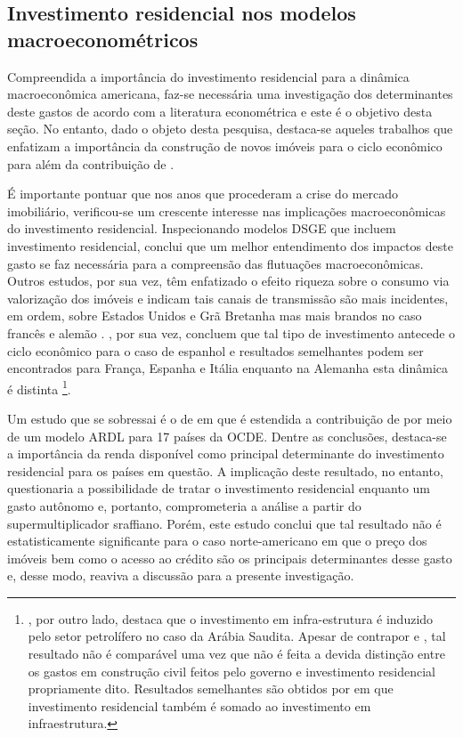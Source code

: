 \subsection{Investimento residencial nos modelos macroeconométricos}\label{RevEmpirica}

Compreendida a importância do investimento residencial para a dinâmica macroeconômica americana, faz-se necessária uma investigação dos determinantes deste gastos de acordo com a literatura econométrica e este é o objetivo desta seção. 
No entanto, dado o objeto desta pesquisa, destaca-se aqueles trabalhos que enfatizam a importância da construção de novos imóveis para o ciclo econômico para além da contribuição de \textcite{leamer_housing_2007}.


É importante pontuar que nos anos que procederam a crise do mercado imobiliário, verificou-se um crescente interesse nas implicações macroeconômicas do investimento residencial. Inspecionando modelos DSGE que incluem investimento residencial, \textcite{iacoviello_housing_2010} conclui que um melhor entendimento dos impactos deste gasto se faz necessária para a compreensão das flutuações macroeconômicas. Outros estudos, por sua vez, têm enfatizado o efeito riqueza sobre o consumo via valorização dos imóveis e indicam tais canais de transmissão são mais incidentes, em ordem, sobre Estados Unidos e Grã Bretanha mas mais brandos no caso francês e alemão \cites{sastre_assessment_2010}{chauvin_wealth_2010}{bassanetti_effects_2010}{arrondel_housing_2010}. 
\textcite{alvarez_does_2010}, por sua vez, concluem que tal tipo de investimento antecede o ciclo econômico para o caso de espanhol e resultados semelhantes podem ser encontrados para França, Espanha  e Itália enquanto na Alemanha esta dinâmica é distinta \cites{ferrara_common_2010}{ferrara_cyclical_2010}\footnote{\textcite{alhowaish_causality_2015}, por outro lado, destaca que o investimento em infra-estrutura é induzido pelo setor petrolífero no caso da Arábia Saudita. Apesar de contrapor \textcite{green_follow_1997}  e \textcite{leamer_housing_2007}, tal resultado não é comparável uma vez que não é feita a devida distinção entre os gastos em construção civil feitos pelo governo e investimento residencial propriamente dito. Resultados semelhantes são obtidos por \textcite{ofori_testing_2003} em que investimento residencial também é somado ao investimento em infraestrutura.}. 

Um estudo que se sobressai é o de \textcite{arestis_residential_2015} em que é estendida a contribuição de \textcite{poterba_tax_1984} por meio de um modelo ARDL para 17 países da OCDE. Dentre as conclusões, destaca-se a importância da renda disponível como principal determinante do investimento residencial para os países em questão.  A implicação deste resultado, no entanto, questionaria a possibilidade de tratar o investimento residencial enquanto um gasto autônomo e, portanto, comprometeria a análise a partir do supermultiplicador sraffiano. Porém, este estudo conclui que tal resultado não é estatisticamente significante para o caso norte-americano em que o preço dos imóveis bem como o acesso ao crédito são os principais determinantes desse gasto e, desse modo, reaviva a discussão para a presente investigação.


